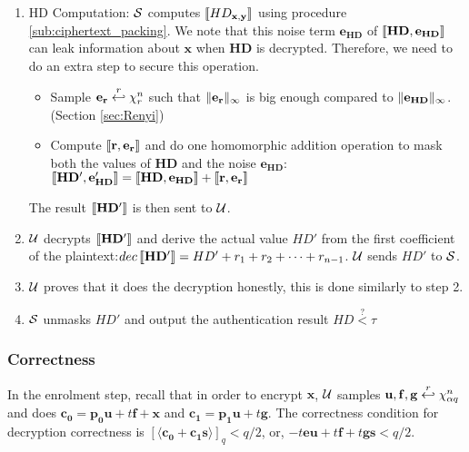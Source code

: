 \begin{description}
\begin{enumerate}
  \item HD Computation: $\mathcal{S}$ computes $\left\llbracket HD_{\mathbf{x,y}}\right\rrbracket$
    using procedure \ref{sub:ciphertext_packing}. We note that this noise term $\mathbf{e_{HD}}$ of
    $\left\llbracket\mathbf{HD,e_{HD}}\right\rrbracket$ can leak information
    about $\mathbf{x}$ when $\mathbf{HD}$ is decrypted. Therefore,
    we need to do
    an extra step to secure this operation.
    \begin{itemize}
    \item Sample $\mathbf{e_{r}} \stackrel{r}{\hookleftarrow} \chi_{r}^n$ such that $\Vert \mathbf{e_r} \Vert_{\infty}$ is big enough compared to
      $\Vert \mathbf{e_{HD}} \Vert_{\infty}$.(Section \ref{sec:Renyi})
    \item Compute $\left\llbracket\mathbf{r,e_r}\right\rrbracket$ and do one homomorphic addition operation to mask both the values of
      $\mathbf{HD}$ and the noise $\mathbf{e_{HD}}$:
      $\left\llbracket\mathbf{HD', e'_{HD}}\right\rrbracket = \left\llbracket\mathbf{HD, e_{HD}}\right\rrbracket + \left\llbracket\mathbf{r,e_r}\right\rrbracket$
    \end{itemize}
    The result $\left\llbracket\mathbf{HD'}\right\rrbracket$ is then sent to $\mathcal{U}$.
  \item \(\mathcal{U}\) decrypts $\left\llbracket\mathbf{HD'}\right\rrbracket$ and derive the actual value ${HD'}$ from the first coefficient of the
    plaintext:\( dec\left\llbracket\mathbf{HD'}\right\rrbracket = HD' + r_1 + r_2 + \dots + r_{n-1} \). \(\mathcal{U}\) sends \(HD'\) to \(\mathcal{S}\).
  \item \(\mathcal{U}\) proves that it does the decryption honestly, this is done similarly to step 2.
  \item \(\mathcal{S}\) unmasks \(HD'\) and output the authentication result \(HD \stackrel{?}{<} \tau\)
  \end{enumerate}

\end{description}

\subsubsection{Correctness}
\label{sec:correctness}
In the enrolment step, recall that in order to encrypt $\mathbf{x}$, $\mathcal{U}$ samples
$\mathbf{u,f,g} \stackrel{r}{\hookleftarrow} \chi_{\alpha q}^n$ and does $\mathbf{c_0} = \mathbf{p_0u} + t\mathbf{f} + \mathbf{x}$ and
$\mathbf{c_1} = \mathbf{p_1u} + t\mathbf{g}$. The correctness condition for decryption correctness is
$[\langle \mathbf{c_0 + c_1s} \rangle]_q < q/2$, or, $-t\mathbf{eu} + t\mathbf{f} + t\mathbf{gs} < q/2$.

